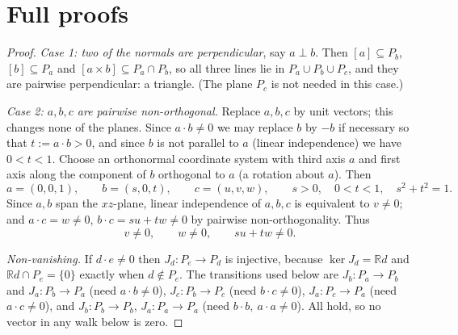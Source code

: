 \documentclass[11pt,a4paper]{article}
\theoremstyle{plain}
\theoremstyle{definition}
\theoremstyle{remark}
\newcommand{\R}{\mathbb R}
\newcommand{\Jm}[1]{J_{#1}}
\newcommand{\Pl}[1]{P_{#1}}
\begin{document}
\appendix

\section{Full proofs}\label{app:proofs}

\label{pf:oddwalk}
\lemoddwalk*
\begin{proof}
\emph{Case 1: two of the normals are perpendicular}, say $a\perp b$. Then $[a]\subseteq\Pl b$, $[b]\subseteq\Pl a$ and $[a\times b]\subseteq\Pl a\cap\Pl b$, so all three lines lie in $\Pl a\cup\Pl b\cup\Pl c$, and they are pairwise perpendicular: a triangle. (The plane $\Pl c$ is not needed in this case.)

\emph{Case 2: $a,b,c$ are pairwise non-orthogonal.} Replace $a,b,c$ by unit vectors; this changes none of the planes. Since $a\cdot b\ne0$ we may replace $b$ by $-b$ if necessary so that $t:=a\cdot b>0$, and since $b$ is not parallel to $a$ (linear independence) we have $0<t<1$. Choose an orthonormal coordinate system with third axis $a$ and first axis along the component of $b$ orthogonal to $a$ (a rotation about $a$). Then
\[
a=(0,0,1),\qquad b=(s,0,t),\qquad c=(u,v,w),\qquad s>0,\quad 0<t<1,\quad s^2+t^2=1 .
\]
Since $a,b$ span the $xz$-plane, linear independence of $a,b,c$ is equivalent to $v\ne0$; and $a\cdot c=w\ne0$, $b\cdot c=su+tw\ne0$ by pairwise non-orthogonality. Thus
\begin{equation}\label{eq:cond}
v\ne0,\qquad w\ne0,\qquad su+tw\ne0 .
\end{equation}

\emph{Non-vanishing.} If $d\cdot e\ne0$ then $\Jm d\colon\Pl e\to\Pl d$ is injective, because $\ker\Jm d=\R d$ and $\R d\cap\Pl e=\{0\}$ exactly when $d\notin\Pl e$. The transitions used below are $\Jm b\colon\Pl a\to\Pl b$ and $\Jm a\colon\Pl b\to\Pl a$ (need $a\cdot b\ne0$), $\Jm c\colon\Pl b\to\Pl c$ (need $b\cdot c\ne0$), $\Jm a\colon\Pl c\to\Pl a$ (need $a\cdot c\ne0$), and $\Jm b\colon\Pl b\to\Pl b$, $\Jm a\colon\Pl a\to\Pl a$ (need $b\cdot b,\ a\cdot a\ne0$). All hold, so no vector in any walk below is zero.


\end{proof}
\end{document}
